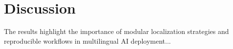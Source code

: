 
\section{Discussion}
The results highlight the importance of modular localization strategies and reproducible workflows in multilingual AI deployment...